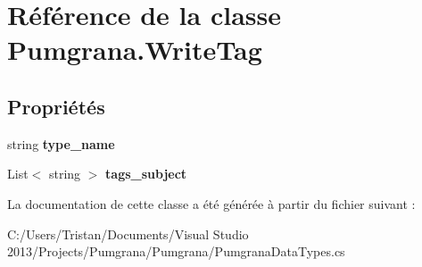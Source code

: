 \hypertarget{class_pumgrana_1_1_write_tag}{\section{Référence de la classe Pumgrana.\+Write\+Tag}
\label{class_pumgrana_1_1_write_tag}
}
\subsection*{Propriétés}
\begin{DoxyCompactItemize}
\item 
\hypertarget{class_pumgrana_1_1_write_tag_a7299b7446b15834aed0e49affde6565d}{string {\bfseries type\+\_\+name}}\label{class_pumgrana_1_1_write_tag_a7299b7446b15834aed0e49affde6565d}

\item 
\hypertarget{class_pumgrana_1_1_write_tag_a222b1cda106b1f3d9076983c025887bb}{List$<$ string $>$ {\bfseries tags\+\_\+subject}}\label{class_pumgrana_1_1_write_tag_a222b1cda106b1f3d9076983c025887bb}

\end{DoxyCompactItemize}


La documentation de cette classe a été générée à partir du fichier suivant \+:\begin{DoxyCompactItemize}
\item 
C\+:/\+Users/\+Tristan/\+Documents/\+Visual Studio 2013/\+Projects/\+Pumgrana/\+Pumgrana/Pumgrana\+Data\+Types.\+cs\end{DoxyCompactItemize}
